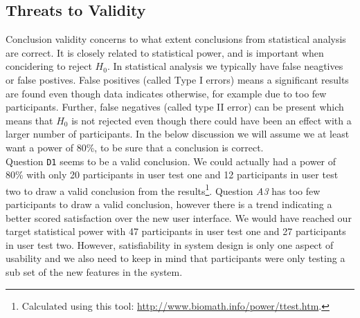 

\subsection{Threats to Validity}
\label{sub-sec:user-test-validity}
Conclusion validity concerns to what extent conclusions from statistical analysis are correct. It is closely related to statistical power, and is important when concidering to reject $H_0$. In statistical analysis we typically have false neagtives or false postives. False positives (called Type I errors) means a significant results are found even though data indicates otherwise, for example due to too few participants. Further, false negatives (called type II error) can be present which means that $H_0$ is not rejected even though there could have been an effect with a larger number of participants. In the below discussion we will assume we at least want a power of 80\%, to be sure that a conclusion is correct. \\

Question \texttt{D1} seems to be a valid conclusion. We could actually had a power of 80\% with only 20 participants in user test one and 12 participants in user test two to draw a valid conclusion from the results\footnote{Calculated using this tool: \url{http://www.biomath.info/power/ttest.htm}.}. Question \textit{A3} has too few participants to draw a valid conclusion, however there is a trend indicating a better scored satisfaction over the new user interface. We would have reached our target statistical power with 47 participants in user test one and 27 participants in user test two. However, satisfiability in system design is only one aspect of usability and we also need to keep in mind that participants were only testing a sub set of the new features in the system. \\

